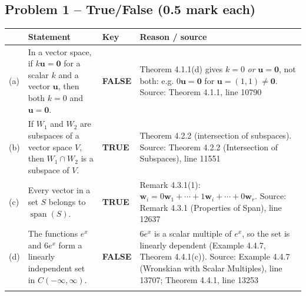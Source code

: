 \documentclass[11pt,a4paper]{article}
\newcommand{\Src}[1]{{\footnotesize\color{black!65}Source: #1}}
\begin{document}
\subsection*{Problem 1 -- True/False (0.5 mark each)}
\begin{tabularx}{\linewidth}{@{}l X l X@{}}\toprule & Statement & Key & Reason / source\\\midrule
(a) & In a vector space, if $k\mathbf{u}=\mathbf{0}$ for a scalar $k$ and a vector $\mathbf{u}$, then both $k=0$ and $\mathbf{u}=\mathbf{0}$. & \textbf{FALSE} & Theorem 4.1.1(d) gives $k=0$ \emph{or} $\mathbf{u}=\mathbf{0}$, not both: e.g. $0\mathbf{u}=\mathbf{0}$ for $\mathbf{u}=(1,1)\neq\mathbf{0}$. \Src{Theorem 4.1.1, line 10790}\\\addlinespace
(b) & If $W_1$ and $W_2$ are subspaces of a vector space $V$, then $W_1\cap W_2$ is a subspace of $V$. & \textbf{TRUE} & Theorem 4.2.2 (intersection of subspaces). \Src{Theorem 4.2.2 (Intersection of Subspaces), line 11551}\\\addlinespace
(c) & Every vector in a set $S$ belongs to $\operatorname{span}(S)$. & \textbf{TRUE} & Remark 4.3.1(1): $\mathbf{w}_i=0\mathbf{w}_1+\cdots+1\mathbf{w}_i+\cdots+0\mathbf{w}_r$. \Src{Remark 4.3.1 (Properties of Span), line 12637}\\\addlinespace
(d) & The functions $e^{x}$ and $6e^{x}$ form a linearly independent set in $C(-\infty,\infty)$. & \textbf{FALSE} & $6e^x$ is a scalar multiple of $e^x$, so the set is linearly dependent (Example 4.4.7, Theorem 4.4.1(c)). \Src{Example 4.4.7 (Wronskian with Scalar Multiples), line 13707; Theorem 4.4.1, line 13253}\\\addlinespace
\bottomrule\end{tabularx}
\end{document}
